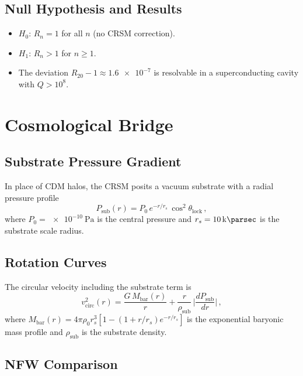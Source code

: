 \documentclass[aps,preprint,superscriptaddress,longbibliography]{revtex4-2}
\begin{document}
\subsection{Null Hypothesis and Results}

\begin{itemize}
\item $H_0$: $R_n = 1$ for all $n$ (no CRSM correction).
\item $H_1$: $R_n > 1$ for $n \geq 1$.
\item The deviation $R_{20} - 1 \approx \num{1.6e-7}$ is
resolvable in a superconducting cavity with $Q > 10^8$.
\end{itemize}

\section{Cosmological Bridge}
\label{sec:cosmo}

\subsection{Substrate Pressure Gradient}

In place of CDM halos, the CRSM posits a vacuum substrate with a
radial pressure profile
\begin{equation}
P_{\mathrm{sub}}(r) = P_0\,e^{-r/r_s}\,
\cos^2\theta_{\mathrm{lock}}\,,
\label{eq:Psub}
\end{equation}
where $P_0 = \SI{e-10}{\pascal}$ is the central pressure and
$r_s = \SI{10}{\kilo\parsec}$ is the substrate scale radius.

\subsection{Rotation Curves}

The circular velocity including the substrate term is
\begin{equation}
v_{\mathrm{circ}}^2(r) = \frac{G\,M_{\mathrm{bar}}(r)}{r}
+ \frac{r}{\rho_{\mathrm{sub}}}\,
\biggl|\frac{dP_{\mathrm{sub}}}{dr}\biggr|\,,
\label{eq:vcirc}
\end{equation}
where $M_{\mathrm{bar}}(r) = 4\pi\rho_0 r_s^3
[1 - (1 + r/r_s)e^{-r/r_s}]$ is the exponential baryonic mass
profile and $\rho_{\mathrm{sub}}$ is the substrate density.

\subsection{NFW Comparison}
\end{document}
